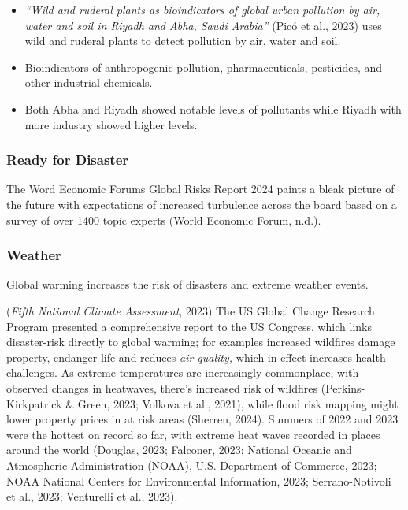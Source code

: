 \documentclass[
  letterpaper,
  DIV=11,
  numbers=noendperiod]{scrartcl}
\providecommand{\tightlist}{%
  \setlength{\itemsep}{0pt}\setlength{\parskip}{0pt}}\usepackage{longtable,booktabs,array}
\begin{document}
\begin{itemize}
\tightlist
\item
  \emph{``Wild and ruderal plants as bioindicators of global urban
  pollution by air, water and soil in Riyadh and Abha, Saudi Arabia''}
  (Picó et al., 2023) uses wild and ruderal plants to detect pollution
  by air, water and soil.
\item
  Bioindicators of anthropogenic pollution, pharmaceuticals, pesticides,
  and other industrial chemicals.
\item
  Both Abha and Riyadh showed notable levels of pollutants while Riyadh
  with more industry showed higher levels.
\end{itemize}

\subsubsection{Ready for Disaster}\label{ready-for-disaster}

The Word Economic Forums Global Risks Report 2024 paints a bleak picture
of the future with expectations of increased turbulence across the board
based on a survey of over 1400 topic experts (World Economic Forum,
n.d.).

\subsubsection{Weather}\label{weather}

Global warming increases the risk of disasters and extreme weather
events.

(\emph{Fifth {National Climate Assessment}}, 2023) The US Global Change
Research Program presented a comprehensive report to the US Congress,
which links disaster-risk directly to global warming; for examples
increased wildfires damage property, endanger life and reduces \emph{air
quality,} which in effect increases health challenges. As extreme
temperatures are increasingly commonplace, with observed changes in
heatwaves, there's increased risk of wildfires (Perkins-Kirkpatrick \&
Green, 2023; Volkova et al., 2021), while flood risk mapping might lower
property prices in at risk areas (Sherren, 2024). Summers of 2022 and
2023 were the hottest on record so far, with extreme heat waves recorded
in places around the world (Douglas, 2023; Falconer, 2023; National
Oceanic and Atmospheric Administration (NOAA), U.S. Department of
Commerce, 2023; NOAA National Centers for Environmental Information,
2023; Serrano-Notivoli et al., 2023; Venturelli et al., 2023).
\end{document}
